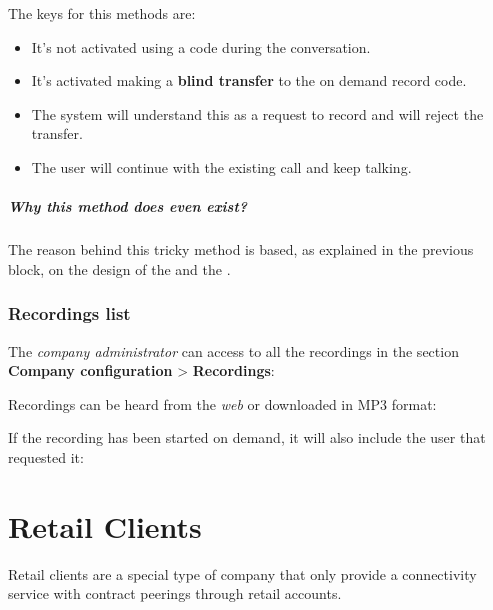 \documentclass[letterpaper,10pt,english]{sphinxmanual}
\begin{document}
The keys for this methods are:
\begin{itemize}
\item {} 
It's not activated using a code during the conversation.

\item {} 
It's activated making a \textbf{blind transfer} to the on demand record code.

\item {} 
The system will understand this as a request to record and will reject the transfer.

\item {} 
The user will continue with the existing call and keep talking.

\end{itemize}
\paragraph{Why this method does even exist?}

The reason behind this tricky method is based, as explained in the previous
block, on the design of the {\hyperref[architecture/index:architecture]{}} and the {\hyperref[architecture/index:audioflow]{}}.


\subsection{Recordings list}
\label{pbx_features/call_recording:recordings-list}
The \emph{company administrator} can access to all the recordings in the section
\textbf{Company configuration} \textgreater{} \textbf{Recordings}:

\noindent{}

Recordings can be heard from the \emph{web} or downloaded in MP3 format:

\noindent{}

If the recording has been started on demand, it will also include the user
that requested it:

\noindent{}


\chapter{Retail Clients}
\label{retail/index:retail-clients}\label{retail/index::doc}
Retail clients are a special type of company that only provide a connectivity
service with contract peerings through retail accounts.
\end{document}
